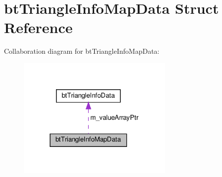 \hypertarget{structbtTriangleInfoMapData}{}\section{bt\+Triangle\+Info\+Map\+Data Struct Reference}
\label{structbtTriangleInfoMapData}


Collaboration diagram for bt\+Triangle\+Info\+Map\+Data\+:
\nopagebreak
\begin{figure}[H]
\begin{center}
\leavevmode
\includegraphics[width=214pt]{structbtTriangleInfoMapData__coll__graph}
\end{center}
\end{figure}
